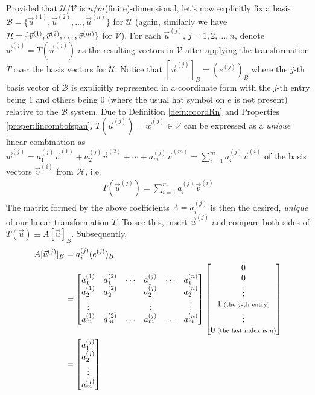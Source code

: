\\
Provided that $\mathcal{U}$/$\mathcal{V}$ is $n$/$m$(finite)-dimensional, let's now explicitly fix a basis $\mathcal{B} = \{\vec{u}^{(1)}, \vec{u}^{(2)}, \ldots, \vec{u}^{(n)}\}$ for $\mathcal{U}$ (again, similarly we have $\mathcal{H} = \{\vec{v}^{(1)}, \vec{v}^{(2)}, \ldots, \\ \vec{v}^{(m)}\}$ for $\mathcal{V}$). For each $\vec{u}^{(j)}$, $j = 1,2,\ldots,n$, denote $\vec{w}^{(j)} = T(\vec{u}^{(j)})$ as the resulting vectors in $\mathcal{V}$ after applying the transformation $T$ over the basis vectors for $\mathcal{U}$. Notice that $[\vec{u}^{(j)}]_B = (e^{(j)})_B$ where the $j$-th basis vector of $\mathcal{B}$ is explicitly represented in a coordinate form with the $j$-th entry being $1$ and others being $0$ (where the usual hat symbol on $e$ is not present) relative to the $\mathcal{B}$ system. Due to Definition \ref{defn:coordRn} and Properties \ref{proper:lincombofspan}, $T(\vec{u}^{(j)}) = \vec{w}^{(j)} \in \mathcal{V}$ can be expressed as a \textit{unique} linear combination as $\vec{w}^{(j)} = a_1^{(j)}\vec{v}^{(1)} + a_2^{(j)}\vec{v}^{(2)} + \cdots + a_m^{(j)}\vec{v}^{(m)} = \sum_{i=1}^{m} a_i^{(j)}\vec{v}^{(i)}$ of the basis vectors $\vec{v}^{(i)}$ from $\mathcal{H}$, i.e.
\begin{align*}
T(\vec{u}^{(j)}) = \sum_{i=1}^{m} a_i^{(j)}\vec{v}^{(i)}
\end{align*}
The matrix formed by the above coefficients $A = a_i^{(j)}$ is then the desired, \textit{unique}  of our linear transformation $T$. To see this, insert $\vec{u}^{(j)}$ and compare both sides of $T(\vec{u}) \equiv A[\vec{u}]_B$. Subsequently,
\begin{align*}
A[\vec{u}^{(j)}]_B &= a_i^{(j)}(e^{(j)})_B \\
&=
\begin{bmatrix}
a_1^{(1)} & a_1^{(2)} & \cdots & a_1^{(j)} & \cdots & a_1^{(n)} \\
a_2^{(1)} & a_2^{(2)} & & a_2^{(j)} & & a_2^{(n)} \\
\vdots & & & \vdots & & \vdots \\
a_m^{(1)} & a_m^{(2)} & \cdots & a_m^{(j)} & \cdots & a_m^{(n)}
\end{bmatrix}
\begin{bmatrix}
0 \\
0 \\
\vdots \\
1 {\scriptsize \text{ (the $j$-th entry)}} \\
\vdots \\
0 {\scriptsize \text{ (the last index is $n$)}}
\end{bmatrix} \\
&=
\begin{bmatrix}
a_1^{(j)} \\
a_2^{(j)} \\
\vdots \\
a_m^{(j)}
\end{bmatrix}
\end{align*}
